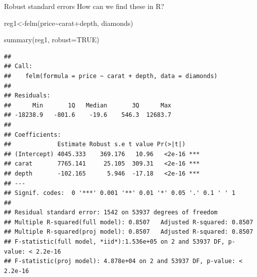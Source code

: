 \documentclass[
  ignorenonframetext,
]{beamer}
\newenvironment{Shaded}{\begin{snugshade}}{\end{snugshade}}
\newcommand{\AttributeTok}[1]{\textcolor[rgb]{0.77,0.63,0.00}{#1}}
\newcommand{\ConstantTok}[1]{\textcolor[rgb]{0.00,0.00,0.00}{#1}}
\newcommand{\FunctionTok}[1]{\textcolor[rgb]{0.00,0.00,0.00}{#1}}
\newcommand{\NormalTok}[1]{#1}
\newcommand{\OtherTok}[1]{\textcolor[rgb]{0.56,0.35,0.01}{#1}}
\newcommand{\SpecialCharTok}[1]{\textcolor[rgb]{0.00,0.00,0.00}{#1}}
\begin{document}
\begin{frame}[fragile]{Robust standard errors}
\protect\hypertarget{robust-standard-errors-7}{}
How can we find these in R?

\tiny

\begin{Shaded}
\begin{Highlighting}[]
\NormalTok{reg1}\OtherTok{\textless{}{-}}\FunctionTok{felm}\NormalTok{(price}\SpecialCharTok{\textasciitilde{}}\NormalTok{carat}\SpecialCharTok{+}\NormalTok{depth, diamonds)}

\FunctionTok{summary}\NormalTok{(reg1, }\AttributeTok{robust=}\ConstantTok{TRUE}\NormalTok{)}
\end{Highlighting}
\end{Shaded}

\begin{verbatim}
## 
## Call:
##    felm(formula = price ~ carat + depth, data = diamonds) 
## 
## Residuals:
##      Min       1Q   Median       3Q      Max 
## -18238.9   -801.6    -19.6    546.3  12683.7 
## 
## Coefficients:
##             Estimate Robust s.e t value Pr(>|t|)    
## (Intercept) 4045.333    369.176   10.96   <2e-16 ***
## carat       7765.141     25.105  309.31   <2e-16 ***
## depth       -102.165      5.946  -17.18   <2e-16 ***
## ---
## Signif. codes:  0 '***' 0.001 '**' 0.01 '*' 0.05 '.' 0.1 ' ' 1
## 
## Residual standard error: 1542 on 53937 degrees of freedom
## Multiple R-squared(full model): 0.8507   Adjusted R-squared: 0.8507 
## Multiple R-squared(proj model): 0.8507   Adjusted R-squared: 0.8507 
## F-statistic(full model, *iid*):1.536e+05 on 2 and 53937 DF, p-value: < 2.2e-16 
## F-statistic(proj model): 4.878e+04 on 2 and 53937 DF, p-value: < 2.2e-16
\end{verbatim}
\end{frame}
\end{document}
